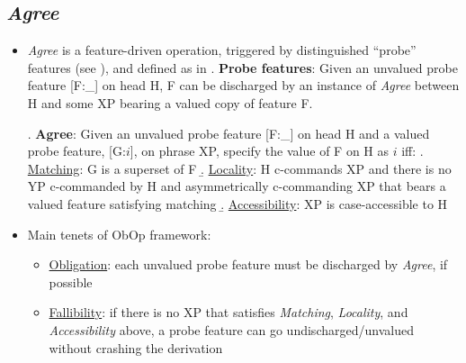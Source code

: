 \documentclass[letterpaper,10pt]{handout_nick}
\begin{document}
\subsection{\emph{Agree}}
\begin{itemize}
\item \emph{Agree} is a feature-driven operation, triggered by distinguished ``probe'' features (see \Next), and defined as in \NNext
\ex. \textbf{Probe features}: Given an unvalued probe feature [F:\_] on head H, F can be discharged by an instance of \emph{Agree} between H and some XP bearing a valued copy of feature F. 

\ex. \textbf{Agree}:
Given an unvalued probe feature [F:\_] on head H and a valued probe feature, [G:$i$], on phrase XP, specify the value of F on H as $i$ iff:
\a. \underline{Matching}: G is a superset of F
\b. \underline{Locality}: H c-commands XP and there is no YP c-commanded by H and asymmetrically c-commanding XP that bears a valued feature satisfying matching
\b. \underline{Accessibility}: XP is case-accessible to H 

\item Main tenets of ObOp framework: 
\begin{itemize}
\item \underline{Obligation}: each unvalued probe feature must be discharged by \emph{Agree}, if possible 
\item \underline{Fallibility}: if there is no XP that satisfies \emph{Matching}, \emph{Locality}, and \emph{Accessibility} above, a probe feature can go undischarged/unvalued without crashing the derivation
\end{itemize} 
\end{itemize}
\end{document}
